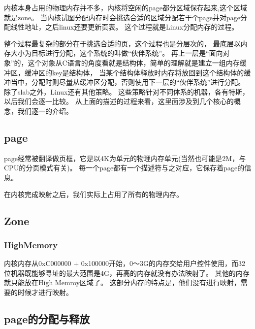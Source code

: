 内核本身占用的物理内存并不多，内核将空闲的page都分区域保存起来,这个区域就是zone。
当内核试图分配内存时会挑选合适的区域分配若干个page并对page分配线性地址，之后linux还要更新页表。
这个过程就是Linux分配内存的过程。


整个过程最复杂的部分在于挑选合适的页，这个过程也是分层次的， 最底层以内存大小为目标进行分配，这个系统的叫做“伙伴系统”。
再上一层是“面向对象”的，这个对象从C语言的角度看就是结构体，简单的理解就是建立一组内存缓冲区，缓冲区的key是结构体， 当某个结构体释放时内存将放回到这个结构体的缓冲当中，分配时则尽量从缓冲区分配，否则使用下一层的“伙伴系统”进行分配。
除了slab之外，Linux还有其他策略。
这些策略针对不同体系的机器，各有特斯，以后我们会逐一比较。
从上面的描述的过程来看，这里面涉及到几个核心的概念，我们逐一的介绍。

\subsection{page}
page经常被翻译做页框，它是以4K为单元的物理内存单元(当然也可能是2M，与CPU的分页模式有关)。
每一个page都有一个描述符与之对应，它保存着page的信息。


在内核完成映射之后，我们实际上占用了所有的物理内存。
\subsection{Zone}

\subsubsection{HighMemory}
内核内存从0xC000000 + 0x100000开始，0～3G的内存交给用户控件使用，而32位机器既能够寻址的最大范围是4G，再高的内存就没有办法映射了。
其他的内存就只能放在High Memroy区域了。
这部分内存的特点是，他们没有进行映射，需要的时候才进行映射。

\subsection{page的分配与释放}

